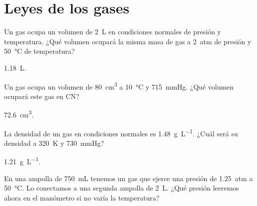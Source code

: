 \section{Leyes de los gases}

\begin{exercise}[
    tags    = {termodinámica, entalpía, entalpia de reacción, calor},
    topics  = {química, termoquímica, termodinámica},
    source  = {FQ 1B OXF 2015, p60, e46},
  ]
  Un gas ocupa un volumen de \SI{2}{\liter} en condiciones normales de presión y temperatura. ¿Qué volumen ocupará la misma masa de gas a \SI{2}{atm} de presión y \SI{50}{\celsius} de temperatura?
\end{exercise}

\begin{solution}
  \SI{1.18}{\liter}.
\end{solution}




\begin{exercise}[
    tags    = {termodinámica, entalpía, entalpia de reacción, calor},
    topics  = {química, termoquímica, termodinámica},
    source  = {FQ 1B OXF 2015, p60, e16},
  ]
  Un gas ocupa un volumen de \SI{80}{\cubic\centi\meter} a \SI{10}{\celsius} y \SI{715}{\mmHg}. ¿Qué volumen ocupará este gas en CN?
\end{exercise}

\begin{solution}
  \SI{72.6}{\cubic\centi\meter}.
\end{solution}




\begin{exercise}[
    tags    = {termodinámica, entalpía, entalpia de reacción, calor},
    topics  = {química, termoquímica, termodinámica},
    source  = {FQ 1B OXF 2015, p60, e19},
  ]
  La densidad de un gas en condiciones normales es \SI{1.48}{\gram\per\liter}. ¿Cuál será su densidad a \SI{320}{\kelvin} y \SI{730}{\mmHg}?
\end{exercise}

\begin{solution}
  \SI{1.21}{\gram\per\liter}.
\end{solution}




\begin{exercise}[
    tags    = {termodinámica, entalpía, entalpia de reacción, calor},
    topics  = {química, termoquímica, termodinámica},
    source  = {FQ 1B SAN 2015, p66, e37},
  ]
  En una ampolla de \SI{750}{\milli\liter} tenemos un gas que ejerce una presión de \SI{1.25}{atm} a \SI{50}{\celsius}. Lo conectamos a una segunda ampolla de \SI{2}{\liter}. ¿Qué presión leeremos ahora en el manómetro si no varía la temperatura?
\end{exercise}

